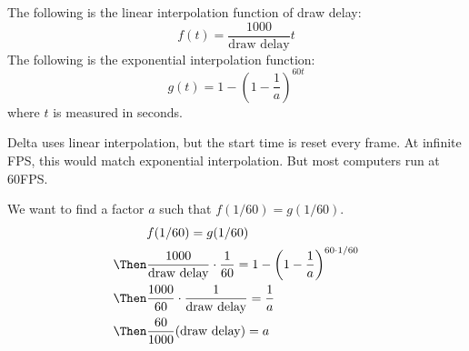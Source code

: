 \documentclass[11pt]{report}
\begin{document}
\yxheaders

The following is the linear interpolation function of draw delay:
\[ f(t) = \frac{1000}{\textrm{draw delay}} t \]
The following is the exponential interpolation function:
\[ g(t) = 1 - \left(1 - \frac{1}{a}\right)^{60t} \]
where $t$ is measured in seconds. \nl

Delta uses linear interpolation, but the start time is reset every frame.
At infinite FPS, this would match exponential interpolation. But most computers run at 60FPS. \nl

We want to find a factor $a$ such that $f(1/60) = g(1/60)$.
\begin{alignat*}{2}
  & f(1/60) = g(1/60) \\
  \Then& \frac{1000}{\textrm{draw delay}} \cdot \frac{1}{60} = 1 - \left(1 - \frac{1}{a}\right)^{60 \cdot 1/60} \\
  \Then& \frac{1000}{60} \cdot \frac{1}{\textrm{draw delay}} = \frac{1}{a} \\
  \Then& \frac{60}{1000} (\textrm{draw delay}) = a
\end{alignat*}
\end{document}
